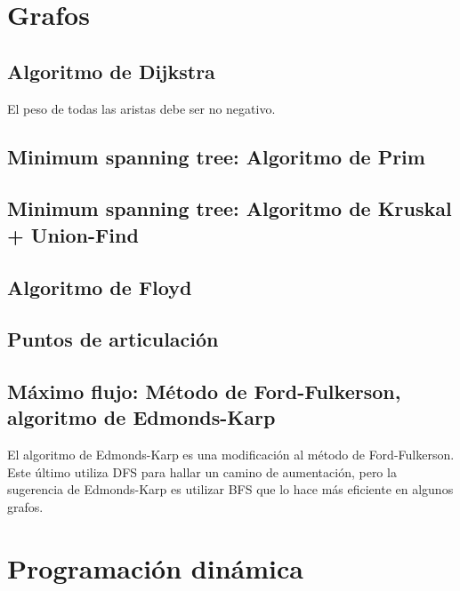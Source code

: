 \documentclass[10pt,letterpaper]{article}
\begin{document}
\bigskip



\section{Grafos}
\subsection{Algoritmo de Dijkstra}
El peso de todas las aristas debe ser no negativo.
\\

\subsection{Minimum spanning tree: Algoritmo de Prim}


\subsection{Minimum spanning tree: Algoritmo de Kruskal + Union-Find}

\subsection{Algoritmo de Floyd}

\subsection{Puntos de articulación}

\subsection{Máximo flujo: Método de Ford-Fulkerson, algoritmo de Edmonds-Karp}
El algoritmo de Edmonds-Karp es una modificación al método de Ford-Fulkerson. Este último
utiliza DFS para hallar un camino de aumentación, pero la sugerencia de Edmonds-Karp
es utilizar BFS que lo hace más eficiente en algunos grafos.

\section{Programación dinámica}
\end{document}
